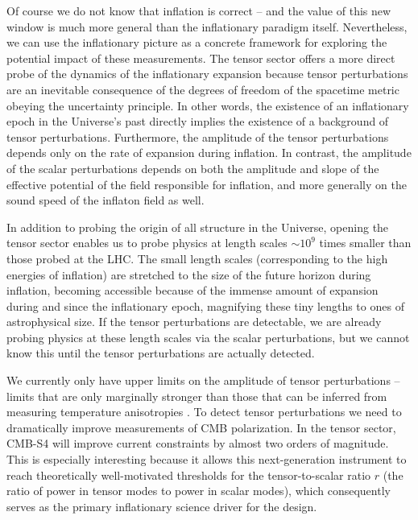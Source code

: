 Of course we do not know that inflation is correct -- and the value of this new window is much more general than the inflationary paradigm itself.  Nevertheless, we can use the inflationary picture as a concrete framework for exploring the potential impact of these measurements. The tensor sector offers a more direct probe of the dynamics of the inflationary expansion because tensor perturbations are an inevitable consequence of the degrees of freedom of the spacetime metric obeying the uncertainty principle. In other words, the existence of an inflationary epoch in the Universe's past directly implies the existence of a background of tensor perturbations. Furthermore, the amplitude of the tensor perturbations depends only on the rate of expansion during inflation. In contrast, the amplitude of the scalar perturbations depends on both the amplitude and slope of the effective potential of the field responsible for inflation, and more generally on the sound speed of the inflaton field as well.

In addition to probing the origin of all structure in the Universe, opening the tensor sector enables us to probe physics at length scales $\sim 10^9$ times smaller than those probed at the LHC. The small length scales (corresponding to the high energies of inflation) are stretched to the size of the future horizon during inflation, becoming accessible because of the immense amount of expansion during and since the inflationary epoch, magnifying these tiny lengths to ones of astrophysical size. If the tensor perturbations are detectable, we are already probing physics at these length scales via the scalar perturbations, but we cannot know this until the tensor perturbations are actually detected.

We currently only have upper limits on the amplitude of tensor perturbations -- limits that are only marginally stronger than those that can be inferred from measuring temperature anisotropies \cite{Ade:2015lrj,Array:2015xqh}. To detect tensor perturbations we need to dramatically improve measurements of CMB polarization. %
In the tensor sector, CMB-S4 will improve current constraints by almost two orders of magnitude. This is especially interesting because it allows this next-generation instrument to reach theoretically well-motivated thresholds for the tensor-to-scalar ratio $r$ (the ratio of power in tensor modes to power in scalar modes), which consequently serves as the primary inflationary science driver for the design. 

